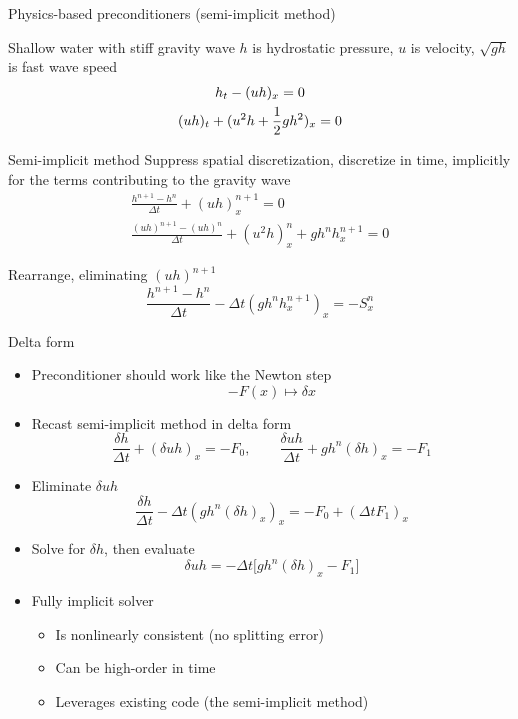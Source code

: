 \begin{frame}[shrink=1]{Physics-based preconditioners (semi-implicit method)}
  \begin{block}{Shallow water with stiff gravity wave}
    $h$ is hydrostatic pressure, $u$ is velocity, $\sqrt{gh}$ is fast wave speed
    \begin{gather*}
      h_t - (uh)_x = 0 \\
      (uh)_t + (u^2h + {\frac 1 2} gh^2)_x = 0
    \end{gather*}
  \end{block}
  \vspace{-2.5em}
  \begin{block}{Semi-implicit method}
    Suppress spatial discretization, discretize in time, implicitly for the terms contributing to the gravity wave
    \begin{gather*}
      \frac{h^{n+1} - h^n}{\Delta t} + (uh)_x^{n+1} = 0 \\
      \frac{(uh)^{n+1} - (uh)^{n}}{\Delta t} + (u^2h)_x^{n} + gh^n h_x^{n+1} = 0
    \end{gather*}

    Rearrange, eliminating $(uh)^{n+1}$
    \[ \frac{h^{n+1} - h^n}{\Delta t} - \Delta t(gh^n h_x^{n+1})_x = -S_x^n \]
  \end{block}
\end{frame}

\begin{frame}[shrink=1]{Delta form}
  \begin{itemize}
  \item Preconditioner should work like the Newton step
    \[ -F(x) \mapsto \delta x \]
  \item Recast semi-implicit method in delta form
    \[ \frac{\delta h}{\Delta t} + (\delta uh)_x = -F_0, \qquad \frac{\delta uh}{\Delta t} + g h^n (\delta h)_x = -F_1 \]
  \item Eliminate $\delta uh$
    \[ \frac{\delta h}{\Delta t} - \Delta t(gh^n (\delta h)_x)_x = -F_0 + (\Delta t F_1)_x \]
  \item Solve for $\delta h$, then evaluate
    \[ \delta uh = - \Delta t \big[ gh^n (\delta h)_x - F_1 \big] \]
  \item Fully implicit solver
    \begin{itemize}
    \item Is nonlinearly consistent (no splitting error)
    \item Can be high-order in time
    \item Leverages existing code (the semi-implicit method)
    \end{itemize}
  \end{itemize}
\end{frame}
